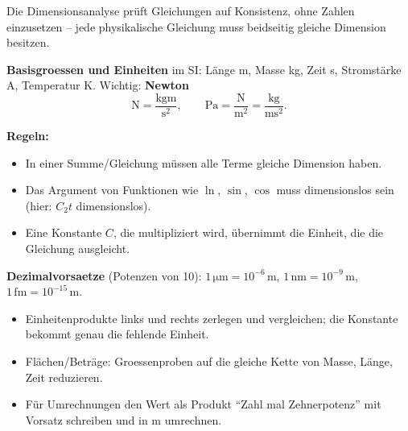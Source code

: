 

Die Dimensionsanalyse prüft Gleichungen auf Konsistenz, ohne Zahlen
einzusetzen -- jede physikalische Gleichung muss beidseitig gleiche
Dimension besitzen.

\begin{werkzeugkasten}[Werkzeuge]
\textbf{Basisgroessen und Einheiten} im SI:
L\"ange \unit{\metre}, Masse \unit{\kilogram}, Zeit \unit{\second},
Stromst\"arke \unit{\ampere}, Temperatur \unit{\kelvin}.
Wichtig: \textbf{Newton}
\begin{equation}
  \unit{\newton}=\frac{\unit{\kilogram\metre}}{\unit{\second\squared}},
  \qquad
  \unit{\pascal}=\frac{\unit{\newton}}{\unit{\metre\squared}}
  =\frac{\unit{\kilogram}}{\unit{\metre\second\squared}}.
\end{equation}

\textbf{Regeln:}
\begin{itemize}
  \item In einer Summe/Gleichung m\"ussen alle Terme gleiche Dimension
        haben.
  \item Das Argument von Funktionen wie $\ln$, $\sin$, $\cos$ muss
        dimensionslos sein (hier: $C_2t$ dimensionslos).
  \item Eine Konstante $C$, die multipliziert wird, übernimmt die
        Einheit, die die Gleichung ausgleicht.
\end{itemize}

\textbf{Dezimalvorsaetze} (Potenzen von 10):
$1\,\mathrm{\mu m}=10^{-6}\,\mathrm m$, $1\,\mathrm{nm}=10^{-9}\,\mathrm m$,
$1\,\mathrm{fm}=10^{-15}\,\mathrm m$.
\end{werkzeugkasten}

\begin{werkzeugkasten}[Vorgehen]
\begin{itemize}
  \item Einheitenprodukte links und rechts zerlegen und vergleichen;
        die Konstante bekommt genau die fehlende Einheit.
  \item Fl\"achen/Beträge: Groessenproben auf die gleiche Kette von
        Masse, Länge, Zeit reduzieren.
  \item Für Umrechnungen den Wert als Produkt ``Zahl mal Zehnerpotenz''
        mit Vorsatz schreiben und in \unit{\metre} umrechnen.
\end{itemize}
\end{werkzeugkasten}


